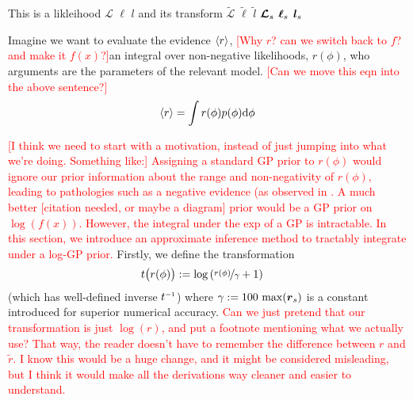 \documentclass{article}
\begin{document}
This is a likleihood $\mathcal{L}$ $\ell$ $l$ and its transform $\tilde{\mathcal{L}}$ $\tilde{\ell}$ $\tilde{l}$ $\vect{\mathcal{L}}_s$ $\vect{\ell}_s$ $\vect{l}_s$

Imagine we want to evaluate the evidence $\inty{r}$, \textcolor{red}{[Why $r$? can we switch back to $f$? and make it $f(x)$?]}an integral over non-negative likelihoods, $r(\phi)$, who arguments are the parameters of the relevant model. \textcolor{red}{[Can we move this eqn into the above sentence?]}
$$
\inty{r} = \int r(\phi) p(\phi) \ud\phi
$$

\textcolor{red}{[I think we need to start with a motivation, instead of just jumping into what we're doing.  Something like:] Assigning a standard GP prior to $r(\phi)$ would ignore our prior information about the range and non-negativity of $r(\phi)$, leading to pathologies such as a negative evidence (as observed in \citep{BZMonteCarlo}.  A much better [citation needed, or maybe a diagram] prior would be a GP prior on $\log(f(x))$.  However, the integral under the exp of a GP is intractable.  In this section, we introduce an approximate inference method to tractably integrate under a log-GP prior. }
Firstly, we define the transformation
\begin{align*}
t\bigl(r(\phi)\bigr) & \deq \log\left(\nicefrac{r(\phi)}{\gamma} + 1\right)
\end{align*}
(which has well-defined inverse $t\inv$) where 
$
 \gamma \deq 100\, \max(\vr_s)
$
is a constant introduced for superior numerical accuracy. \textcolor{red}{Can we just pretend that our transformation is just $\log(r)$, and put a footnote mentioning what we actually use?  That way, the reader doesn't have to remember the difference between $r$ and $\tilde{r}$.  I know this would be a huge change, and it might be considered misleading, but I think it would make all the derivations way cleaner and easier to understand.}
\end{document}
